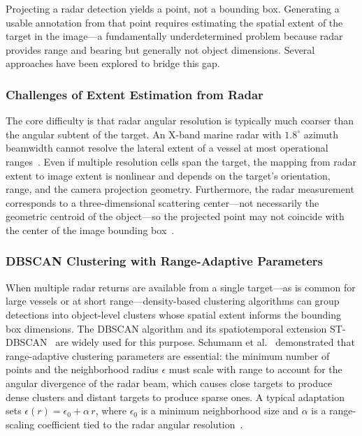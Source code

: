 Projecting a radar detection yields a point, not a bounding box. Generating a usable annotation from that point requires estimating the spatial extent of the target in the image---a fundamentally underdetermined problem because radar provides range and bearing but generally not object dimensions. Several approaches have been explored to bridge this gap.

\subsubsection{Challenges of Extent Estimation from Radar}

The core difficulty is that radar angular resolution is typically much coarser than the angular subtent of the target. An X-band marine radar with $1.8^\circ$ azimuth beamwidth cannot resolve the lateral extent of a vessel at most operational ranges~\cite{Skolnik2008}. Even if multiple resolution cells span the target, the mapping from radar extent to image extent is nonlinear and depends on the target's orientation, range, and the camera projection geometry. Furthermore, the radar measurement corresponds to a three-dimensional scattering center---not necessarily the geometric centroid of the object---so the projected point may not coincide with the center of the image bounding box~\cite{Nabati2021CenterFusion}.

\subsubsection{DBSCAN Clustering with Range-Adaptive Parameters}

When multiple radar returns are available from a single target---as is common for large vessels or at short range---density-based clustering algorithms can group detections into object-level clusters whose spatial extent informs the bounding box dimensions. The DBSCAN algorithm and its spatiotemporal extension ST-DBSCAN~\cite{ester1996dbscan, birant2007stdbscan} are widely used for this purpose. Schumann et al.~\cite{schumann2020radarnet} demonstrated that range-adaptive clustering parameters are essential: the minimum number of points and the neighborhood radius $\epsilon$ must scale with range to account for the angular divergence of the radar beam, which causes close targets to produce dense clusters and distant targets to produce sparse ones. A typical adaptation sets $\epsilon(r) = \epsilon_0 + \alpha\,r$, where $\epsilon_0$ is a minimum neighborhood size and $\alpha$ is a range-scaling coefficient tied to the radar angular resolution~\cite{schumann2020radarnet}.

